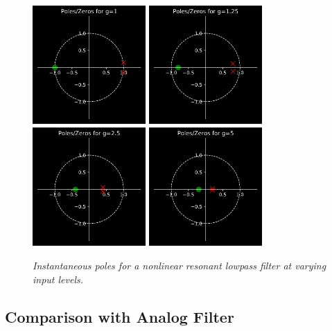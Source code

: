 \documentclass[twoside,a4paper]{article}
\begin{document}
\begin{figure}[!ht]
    \includegraphics[width=1.7in]{../Pics/pz1.png}
    \includegraphics[width=1.7in]{../Pics/pz1-25.png}
    \includegraphics[width=1.7in]{../Pics/pz2-5.png}
    \includegraphics[width=1.7in]{../Pics/pz5.png}
    \caption{\label{pzPlots}{\it Instantaneous poles for a nonlinear resonant
                                lowpass filter at varying input levels.}}
\end{figure}
%

\subsection{Comparison with Analog Filter}
\end{document}
